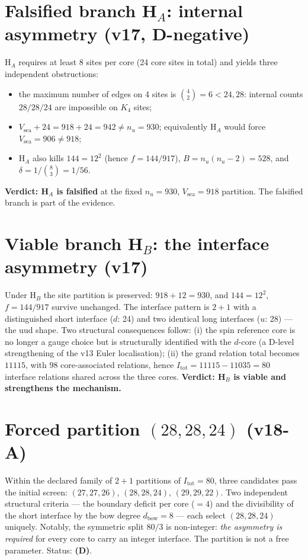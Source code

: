 \documentclass[11pt,a4paper]{article}
\newcommand{\Itot}{I_{\mathrm{tot}}}
\begin{document}
\section{Falsified branch H$_A$: internal asymmetry (v17, D-negative)}
H$_A$ requires at least 8 sites per core (24 core sites in total) and yields three independent obstructions:
\begin{itemize}[leftmargin=1.6em]
\item the maximum number of edges on 4 sites is $\binom{4}{2} = 6 < 24, 28$: internal counts $28/28/24$ are impossible on $K_4$ sites;
\item $V_{\mathrm{sea}} + 24 = 918 + 24 = 942 \neq n_u = 930$; equivalently H$_A$ would force $V_{\mathrm{sea}} = 906 \neq 918$;
\item H$_A$ also kills $144 = 12^2$ (hence $f = 144/917$), $B = n_u(n_u - 2) = 528$, and $\delta = 1/\binom{8}{3} = 1/56$.
\end{itemize}
\textbf{Verdict: H$_A$ is falsified} at the fixed $n_u = 930$, $V_{\mathrm{sea}} = 918$ partition. The falsified branch is part of the evidence.

\section{Viable branch H$_B$: the interface asymmetry (v17)}
Under H$_B$ the site partition is preserved: $918 + 12 = 930$, and $144 = 12^2$, $f = 144/917$ survive unchanged. The interface pattern is $2{+}1$ with a distinguished short interface ($d$: 24) and two identical long interfaces ($u$: 28) --- the uud shape. Two structural consequences follow: (i) the spin reference core is no longer a gauge choice but is structurally identified with the $d$-core (a D-level strengthening of the v13 Euler localisation); (ii) the grand relation total becomes $11115$, with $98$ core-associated relations, hence $\Itot = 11115 - 11035 = 80$ interface relations shared across the three cores. \textbf{Verdict: H$_B$ is viable and strengthens the mechanism.}

\section{Forced partition $(28,28,24)$ (v18-A)}
Within the declared family of $2{+}1$ partitions of $\Itot = 80$, three candidates pass the initial screen: $(27,27,26)$, $(28,28,24)$, $(29,29,22)$. Two independent structural criteria --- the boundary deficit per core ($= 4$) and the divisibility of the short interface by the bow degree $d_{\mathrm{bow}} = 8$ --- each select $(28,28,24)$ uniquely. Notably, the symmetric split $80/3$ is non-integer: \emph{the asymmetry is required} for every core to carry an integer interface. The partition is not a free parameter. Status: \textbf{(D)}.
\end{document}
